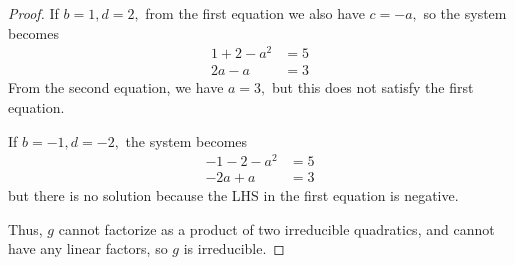 \documentclass{article}
\begin{document}
\begin{itemize}
\begin{enumerate}[(a)]
\begin{proof}
					If $b=1, d=2,$ from the first equation we also have $c=-a,$ so the system becomes
					\begin{align*}
						1+2-a^2 &= 5 \\
						2a-a &= 3 
					\end{align*}
					From the second equation, we have $a=3,$ but this does not satisfy the first equation. 

					If $b=-1, d=-2,$ the system becomes
					\begin{align*}
						-1-2-a^2 &= 5 \\
						-2a+a &= 3
					\end{align*}
					but there is no solution because the LHS in the first equation is negative.

					Thus, $g$ cannot factorize as a product of two irreducible quadratics, and cannot have any linear factors, so $g$ is irreducible.
				\end{proof}
		\end{enumerate}

\end{itemize}
\end{document}
